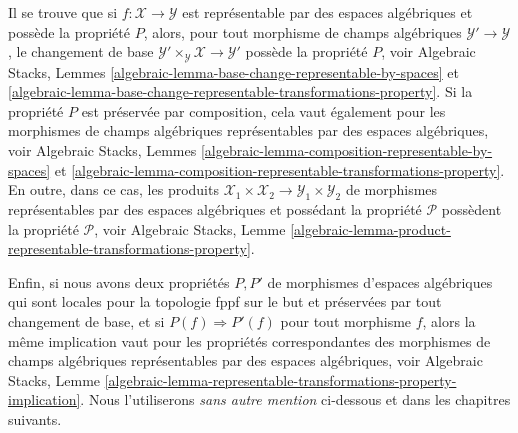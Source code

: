 \medskip\noindent
Il se trouve que si $f : \mathcal{X} \to \mathcal{Y}$ est représentable
par des espaces algébriques et possède la propriété $P$, alors, pour tout morphisme de champs algébriques
$\mathcal{Y}' \to \mathcal{Y}$, le changement de base
$\mathcal{Y}' \times_\mathcal{Y} \mathcal{X} \to \mathcal{Y}'$
possède la propriété $P$, voir
Algebraic Stacks,
Lemmes \ref{algebraic-lemma-base-change-representable-by-spaces} et
\ref{algebraic-lemma-base-change-representable-transformations-property}.
Si la propriété $P$ est préservée par composition, cela vaut
également pour les morphismes de champs algébriques représentables par
des espaces algébriques, voir
Algebraic Stacks,
Lemmes \ref{algebraic-lemma-composition-representable-by-spaces} et
\ref{algebraic-lemma-composition-representable-transformations-property}.
En outre, dans ce cas, les produits
$\mathcal{X}_1 \times \mathcal{X}_2 \to \mathcal{Y}_1 \times \mathcal{Y}_2$
de morphismes représentables par des espaces algébriques et possédant la propriété $\mathcal{P}$
possèdent la propriété $\mathcal{P}$, voir
Algebraic Stacks, Lemme
\ref{algebraic-lemma-product-representable-transformations-property}.

\medskip\noindent
Enfin, si nous avons deux propriétés $P, P'$ de morphismes d'espaces algébriques
qui sont locales pour la topologie fppf sur le but et préservées par tout changement de base,
et si $P(f) \Rightarrow P'(f)$ pour tout morphisme $f$, alors la même
implication vaut pour les propriétés correspondantes des morphismes de champs algébriques
représentables par des espaces algébriques, voir
Algebraic Stacks, Lemme
\ref{algebraic-lemma-representable-transformations-property-implication}.
Nous l'utiliserons {\it sans autre mention} ci-dessous et dans les
chapitres suivants.

